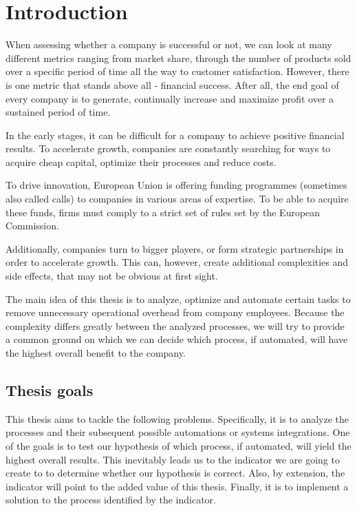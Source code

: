 \documentclass[12pt,oneside]{fithesis2}
\begin{document}
\chapter{Introduction}
When assessing whether a company is successful or not, we can look at many different metrics ranging from market share, through the number of products sold over a specific period of time all the way to customer satisfaction. However, there is one metric that stands above all - financial success. After all, the end goal of every company is to generate, continually increase and maximize profit over a sustained period of time.
\par
In the early stages, it can be difficult for a company to achieve positive financial results. To accelerate growth, companies are constantly searching for ways to acquire cheap capital, optimize their processes and reduce costs.
\par
To drive innovation, European Union is offering funding programmes (sometimes also called calls) to companies in various areas of expertise. To be able to acquire these funds, firms must comply to a strict set of rules set by the European Commission.
\par
Additionally, companies turn to bigger players, or form strategic partnerships in order to accelerate growth. This can, however, create additional complexities and side effects, that may not be obvious at first sight.
\par
The main idea of this thesis is to analyze, optimize and automate certain tasks to remove unnecessary operational overhead from company employees. Because the complexity differs greatly between the analyzed processes, we will try to provide a common ground on which we can decide which process, if automated, will have the highest overall benefit to the company.
\newpage
\section{Thesis goals}
This thesis aims to tackle the following problems. Specifically, it is to analyze the processes and their subsequent possible automations or systems integrations. One of the goals is to test our hypothesis of which process, if automated, will yield the highest overall results. This inevitably leads us to the indicator we are going to create to to determine whether our hypothesis is correct. Also, by extension, the indicator will point to the added value of this thesis. Finally, it is to implement a solution to the process identified by the indicator.
\end{document}
